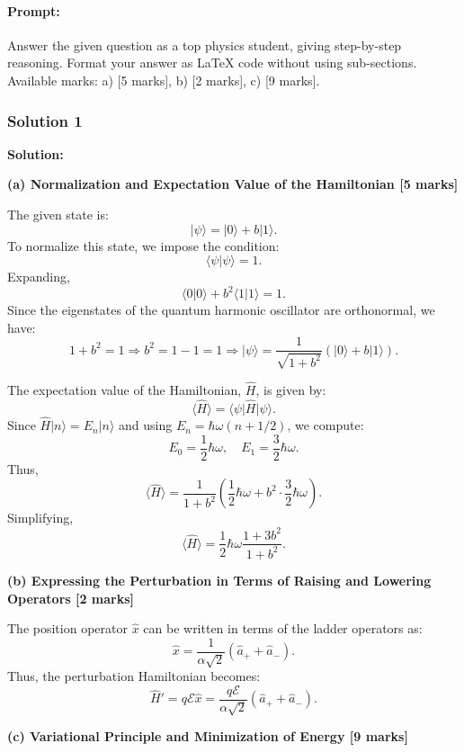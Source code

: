\documentclass{article}
\begin{document}
\paragraph{Prompt: \\} 
Answer the given question as a top physics student, giving step-by-step reasoning. Format your answer as LaTeX code without using sub-sections. Available marks: a) [5 marks], b) [2 marks], c) [9 marks].

\subsubsection{Solution 1}

\noindent \textbf{Solution:}

\textbf{(a) Normalization and Expectation Value of the Hamiltonian [5 marks]}

The given state is:
\[
\vert \psi \rangle = \vert 0 \rangle + b \vert 1 \rangle.
\]
To normalize this state, we impose the condition:
\[
\langle \psi \vert \psi \rangle = 1.
\]
Expanding,
\[
\langle 0 \vert 0 \rangle + b^2 \langle 1 \vert 1 \rangle = 1.
\]
Since the eigenstates of the quantum harmonic oscillator are orthonormal, we have:
\[
1 + b^2 = 1 \Rightarrow b^2 = 1 - 1 = 1 \Rightarrow \vert \psi \rangle = \frac{1}{\sqrt{1 + b^2}} (\vert 0 \rangle + b \vert 1 \rangle).
\]

The expectation value of the Hamiltonian, \( \hat{H} \), is given by:
\[
\langle \hat{H} \rangle = \langle \psi \vert \hat{H} \vert \psi \rangle.
\]
Since \( \hat{H} \vert n \rangle = E_n \vert n \rangle \) and using \( E_n = \hbar \omega (n + 1/2) \), we compute:
\[
E_0 = \frac{1}{2} \hbar \omega, \quad E_1 = \frac{3}{2} \hbar \omega.
\]
Thus,
\[
\langle \hat{H} \rangle = \frac{1}{1 + b^2} \left( \frac{1}{2} \hbar \omega + b^2 \cdot \frac{3}{2} \hbar \omega \right).
\]
Simplifying,
\[
\langle \hat{H} \rangle = \frac{1}{2} \hbar \omega \frac{1 + 3b^2}{1 + b^2}.
\]

\textbf{(b) Expressing the Perturbation in Terms of Raising and Lowering Operators [2 marks]}

The position operator \( \hat{x} \) can be written in terms of the ladder operators as:
\[
\hat{x} = \frac{1}{\alpha \sqrt{2}} (\hat{a}_+ + \hat{a}_-).
\]
Thus, the perturbation Hamiltonian becomes:
\[
\hat{H}' = q\mathcal{E} \hat{x} = \frac{q\mathcal{E}}{\alpha \sqrt{2}} (\hat{a}_+ + \hat{a}_-).
\]

\textbf{(c) Variational Principle and Minimization of Energy [9 marks]}
\end{document}
